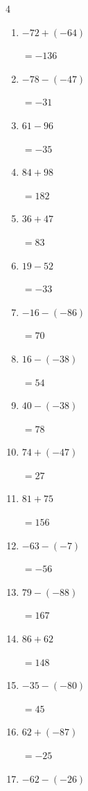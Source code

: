 \begin{multicols}{4}
\begin{enumerate}
        $=-49$

  \item $-72+(-64)$

        $=-136$

\columnbreak %

  \item $-78-(-47)$

        $=-31$

  \item $61-96$

        $=-35$

  \item $84+98$

        $=182$

  \item $36+47$

        $=83$

  \item $19-52$

        $=-33$

  \item $-16-(-86)$

        $=70$

  \item $16-(-38)$

        $=54$

  \item $40-(-38)$

        $=78$

  \item $74+(-47)$

        $=27$

  \item $81+75$

        $=156$

  \item $-63-(-7)$

        $=-56$

  \item $79-(-88)$

        $=167$

  \item $86+62$

        $=148$

  \item $-35-(-80)$

        $=45$

  \item $62+(-87)$

        $=-25$

  \item $-62-(-26)$


\end{enumerate}
\end{multicols}
